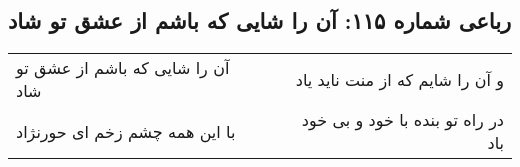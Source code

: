 \begin{center}
\section*{رباعی شماره ۱۱۵: آن را شایی که باشم از عشق تو شاد}
\label{sec:sh115}
\begin{longtable}{l p{0.5cm} r}
آن را شایی که باشم از عشق تو شاد
&&
و آن را شایم که از منت ناید یاد
\\
با این همه چشم زخم ای حورنژاد
&&
در راه تو بنده با خود و بی خود باد
\\
\end{longtable}
\end{center}
